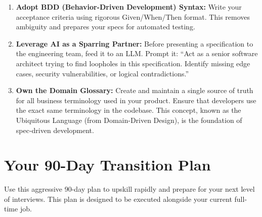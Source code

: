\documentclass[
  11pt,
  openany,
  oneside]{book}
\begin{document}
\begin{enumerate}
  account balance can never be less than zero unless the account has an
  approved overdraft limit.'')
\item
  \textbf{Adopt BDD (Behavior-Driven Development) Syntax:} Write your
  acceptance criteria using rigorous Given/When/Then format. This
  removes ambiguity and prepares your specs for automated testing.
\item
  \textbf{Leverage AI as a Sparring Partner:} Before presenting a
  specification to the engineering team, feed it to an LLM. Prompt it:
  ``Act as a senior software architect trying to find loopholes in this
  specification. Identify missing edge cases, security vulnerabilities,
  or logical contradictions.''
\item
  \textbf{Own the Domain Glossary:} Create and maintain a single source
  of truth for all business terminology used in your product. Ensure
  that developers use the exact same terminology in the codebase. This
  concept, known as the Ubiquitous Language (from Domain-Driven Design),
  is the foundation of spec-driven development.
\end{enumerate}

\bigskip

\section{Your 90-Day Transition Plan}\label{your-90-day-transition-plan}

Use this aggressive 90-day plan to upskill rapidly and prepare for your
next level of interviews. This plan is designed to be executed alongside
your current full-time job.
\end{document}
